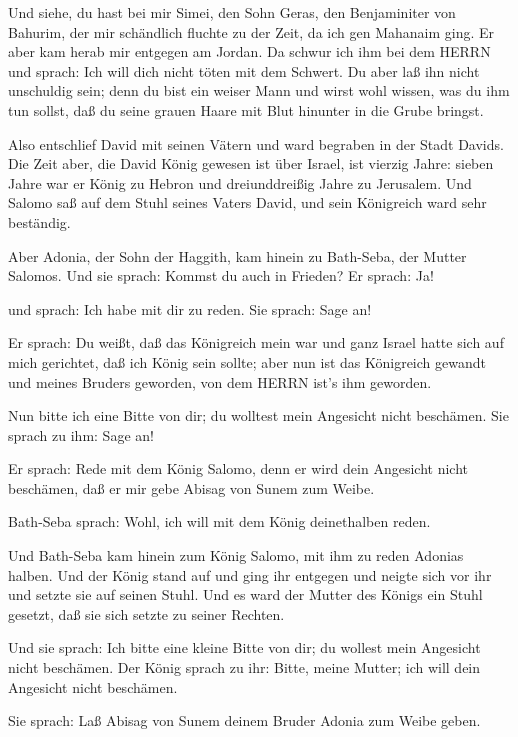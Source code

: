  Und siehe, du hast bei mir Simei, den Sohn Geras, den
Benjaminiter von Bahurim, der mir schändlich fluchte zu der Zeit, da ich
gen Mahanaim ging. Er aber kam herab mir entgegen am Jordan. Da schwur
ich ihm bei dem HERRN und sprach: Ich will dich nicht töten mit dem
Schwert.  Du aber laß ihn nicht unschuldig sein; denn du
bist ein weiser Mann und wirst wohl wissen, was du ihm tun sollst, daß
du seine grauen Haare mit Blut hinunter in die Grube bringst.

 Also entschlief David mit seinen Vätern und ward begraben
in der Stadt Davids.  Die Zeit aber, die David König
gewesen ist über Israel, ist vierzig Jahre: sieben Jahre war er König zu
Hebron und dreiunddreißig Jahre zu Jerusalem.  Und Salomo
saß auf dem Stuhl seines Vaters David, und sein Königreich ward sehr
beständig.

 Aber Adonia, der Sohn der Haggith, kam hinein zu
Bath-Seba, der Mutter Salomos. Und sie sprach: Kommst du auch in
Frieden? Er sprach: Ja!

 und sprach: Ich habe mit dir zu reden. Sie sprach: Sage
an!

 Er sprach: Du weißt, daß das Königreich mein war und ganz
Israel hatte sich auf mich gerichtet, daß ich König sein sollte; aber
nun ist das Königreich gewandt und meines Bruders geworden, von dem
HERRN ist's ihm geworden.

 Nun bitte ich eine Bitte von dir; du wolltest mein
Angesicht nicht beschämen. Sie sprach zu ihm: Sage an!

 Er sprach: Rede mit dem König Salomo, denn er wird dein
Angesicht nicht beschämen, daß er mir gebe Abisag von Sunem zum Weibe.

 Bath-Seba sprach: Wohl, ich will mit dem König
deinethalben reden.

 Und Bath-Seba kam hinein zum König Salomo, mit ihm zu
reden Adonias halben. Und der König stand auf und ging ihr entgegen und
neigte sich vor ihr und setzte sie auf seinen Stuhl. Und es ward der
Mutter des Königs ein Stuhl gesetzt, daß sie sich setzte zu seiner
Rechten.

 Und sie sprach: Ich bitte eine kleine Bitte von dir; du
wollest mein Angesicht nicht beschämen. Der König sprach zu ihr: Bitte,
meine Mutter; ich will dein Angesicht nicht beschämen.

 Sie sprach: Laß Abisag von Sunem deinem Bruder Adonia zum
Weibe geben.

